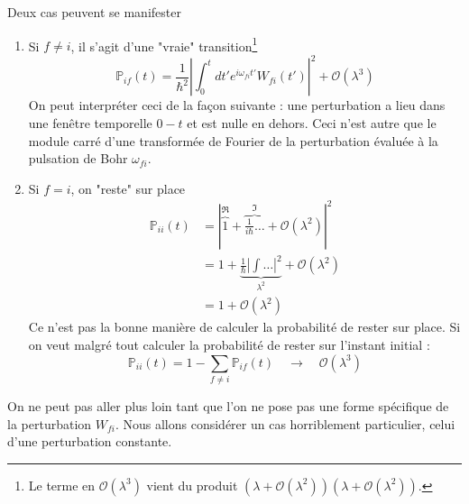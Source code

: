 		Deux cas peuvent se manifester 
		\begin{enumerate}
		\item Si $f\neq i$, il s'agit d'une "vraie" transition\footnote{Le terme en $\mathcal{O}(\lambda^3)$ 
		vient du produit $(\lambda+\mathcal{O}(\lambda^2))(\lambda+\mathcal{O}(\lambda^2))$.}
		\begin{equation}
		\mathbb{P}_{if}(t) = \frac{1}{\hbar^2}\left| \int_0^t dt' e^{i\omega_{fi}t'}W_{fi}(t')\right|^2
		+\mathcal{O}(\lambda^3)
		\end{equation}
		On peut interpréter ceci de la façon suivante : une perturbation a lieu dans une fenêtre 
		temporelle $0-t$ et est nulle en dehors. Ceci n'est autre que le module carré d'une 
		transformée de Fourier de la perturbation évaluée à la pulsation de Bohr $\omega_{fi}$.
		
		\item Si $f=i$, on "reste" sur place
		\begin{equation}
		\begin{array}{ll}
		\mathbb{P}_{ii}(t) &= \left|\overbrace{1}^{\Re}+\overbrace{\frac{1}{i\hbar}\dots}^{\Im}
		 + \mathcal{O}(\lambda^2)\right|^2\\
		 &= 1+\underbrace{\frac{1}{\hbar}\left|\int\dots\right|^2}_{\lambda^2} + \mathcal{O}(\lambda^2)\\
		 &= 1+\mathcal{O}(\lambda^2)
		\end{array}
		\end{equation}
		Ce n'est pas la bonne manière de calculer la probabilité de rester sur place. Si on veut malgré tout 
		calculer la probabilité de 	rester sur l'instant initial : 
		\begin{equation}
		\mathbb{P}_{ii}(t) = 1-\sum_{f\neq i} \mathbb{P}_{if}(t)\quad\longrightarrow\quad \mathcal{O}(\lambda^3)
		\end{equation}
		\end{enumerate}						
		On ne peut pas aller plus loin tant que l'on ne pose pas une forme spécifique de la perturbation 
		$W_{fi}$. Nous allons considérer un cas horriblement particulier, celui d'une perturbation 
		constante.

